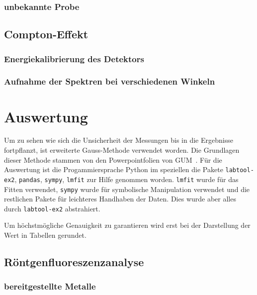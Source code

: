 \documentclass[12pt,english,ngerman]{scrartcl}
\begin{document}
\subsubsection{unbekannte Probe}


\subsection{Compton-Effekt}

\subsubsection{Energiekalibrierung des Detektors}

\subsubsection{Aufnahme der Spektren bei verschiedenen Winkeln}





\section{Auswertung}\label{sec:auswertung}

Um zu sehen wie sich die Unsicherheit der Messungen bis in die Ergebnisse
fortpflanzt, ist erweiterte Gauss-Methode verwendet worden. Die Grundlagen
dieser Methode stammen von den Powerpointfolien von
GUM~\cite{wolfgang_kessel_isobipm-gum_2004}. Für die Auswertung ist die
Progammiersprache Python im speziellen die Pakete \verb#labtool-ex2#,
\verb#pandas#, \verb#sympy#, \verb#lmfit# zur Hilfe genommen worden.
\verb#lmfit# wurde für das Fitten verwendet, \verb#sympy# wurde für symbolische
Manipulation verwendet und die restlichen Pakete für leichteres Handhaben der
Daten. Dies wurde aber alles durch \verb#labtool-ex2# abstrahiert.

Um höchstmögliche Genauigkeit zu garantieren wird erst bei der Darstellung der
Wert in Tabellen gerundet.


\subsection{Röntgenfluoreszenzanalyse}

\subsubsection{bereitgestellte Metalle}
\end{document}
